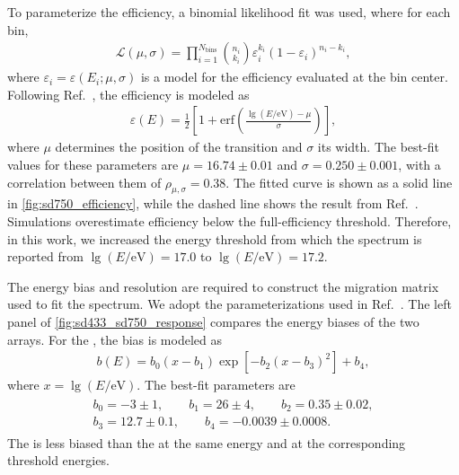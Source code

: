 \documentclass[main.tex]{subfiles}
\begin{document}
To parameterize the efficiency, a binomial likelihood fit was used, where for each bin,
\begin{align}
    \mathcal{L}(\mu,\sigma)
    =
    \prod_{i=1}^{N_{\mathrm{bins}}}
    \binom{n_i}{k_i}
    \varepsilon_i^{k_i}
    (1-\varepsilon_i)^{n_i-k_i},
\end{align}
\noindent where $\varepsilon_i=\varepsilon(E_i;\mu,\sigma)$ is a model for the efficiency evaluated at the bin center.
Following Ref.~\cite{PierreAuger:2021:InfillSpectrum}, the efficiency is modeled as
\begin{align}
    \varepsilon(E)
    =
    \frac{1}{2}
    \left[
    1+\mathrm{erf}
    \left(
    \frac{\lg(E/\mathrm{eV})-\mu}{\sigma}
    \right)
    \right],
\end{align}
\noindent where $\mu$ determines the position of the transition and $\sigma$ its width.
The best-fit values for these parameters are $\mu=16.74\pm0.01$ and $\sigma=0.250\pm0.001$, with a correlation between them of $\rho_{\mu,\sigma}=0.38$.
The fitted curve is shown as a solid line in \cref{fig:sd750_efficiency}, while the dashed line shows the result from Ref.~\cite{PierreAuger:2021:InfillSpectrum}.
Simulations overestimate  efficiency below the full-efficiency threshold. Therefore, in this work, we increased the  energy threshold from which the spectrum is reported from $\lg(E/\mathrm{eV})=17.0$ to $\lg(E/\mathrm{eV})=17.2$.


The  energy bias and resolution are required to construct the migration matrix used to fit the spectrum.
We adopt the parameterizations used in Ref.~\cite{PierreAuger:2021:InfillSpectrum}.
The left panel of \cref{fig:sd433_sd750_response} compares the energy biases of the two arrays.
For the , the bias is modeled as
\begin{align}
    b(E)=b_0(x-b_1)\exp
    \left[
    -b_2(x-b_3)^2
    \right]+b_4,
    \label{eq:sd750_bias}
\end{align}
\noindent where $x=\lg(E/\mathrm{eV})$.
The best-fit parameters are
\begin{align*}
    \begin{gathered}
        b_0 = -3 \pm 1, \qquad
        b_1 = 26 \pm 4, \qquad
        b_2 = 0.35 \pm 0.02, \\[4pt]
        b_3 = 12.7 \pm 0.1, \qquad
        b_4 = -0.0039 \pm 0.0008.
    \end{gathered}
\end{align*}
The  is less biased than the  at the same energy and at the corresponding threshold energies.
\end{document}
